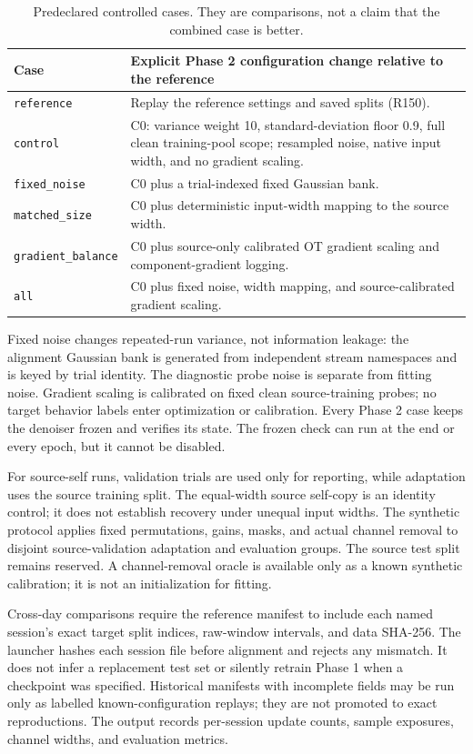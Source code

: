 \documentclass[11pt,a4paper]{article}
\begin{document}
\begin{table}[htbp]
\centering\small
\begin{tabularx}{\linewidth}{@{}lX@{}}
\toprule
Case & Explicit Phase 2 configuration change relative to the reference\\
\midrule
\texttt{reference} & Replay the reference settings and saved splits (R150).\\
\texttt{control} & C0: variance weight 10, standard-deviation floor 0.9, full clean training-pool scope; resampled noise, native input width, and no gradient scaling.\\
\texttt{fixed\_noise} & C0 plus a trial-indexed fixed Gaussian bank.\\
\texttt{matched\_size} & C0 plus deterministic input-width mapping to the source width.\\
\texttt{gradient\_balance} & C0 plus source-only calibrated OT gradient scaling and component-gradient logging.\\
\texttt{all} & C0 plus fixed noise, width mapping, and source-calibrated gradient scaling.\\
\bottomrule
\end{tabularx}
\caption{Predeclared controlled cases. They are comparisons, not a claim that
the combined case is better.}
\end{table}

Fixed noise changes repeated-run variance, not information leakage: the
alignment Gaussian bank is generated from independent stream namespaces and is
keyed by trial identity. The diagnostic probe noise is separate from fitting
noise. Gradient scaling is calibrated on fixed clean source-training probes;
no target behavior labels enter optimization or calibration. Every Phase 2
case keeps the denoiser frozen and verifies its state. The frozen check can run
at the end or every epoch, but it cannot be disabled.

For source-self runs, validation trials are used only for reporting, while
adaptation uses the source training split. The equal-width source self-copy is
an identity control; it does not establish recovery under unequal input widths.
The synthetic protocol applies fixed permutations, gains, masks, and actual
channel removal to disjoint source-validation adaptation and evaluation groups.
The source test split remains reserved. A channel-removal oracle is available
only as a known synthetic calibration; it is not an initialization for fitting.

Cross-day comparisons require the reference manifest to include each named
session's exact target split indices, raw-window intervals, and data SHA-256.
The launcher hashes each session file before alignment and rejects any
mismatch. It does not infer a replacement test set or silently retrain Phase
1 when a checkpoint was specified. Historical manifests with incomplete
fields may be run only as labelled known-configuration replays; they are not
promoted to exact reproductions. The output records per-session update counts,
sample exposures, channel widths, and evaluation metrics.
\end{document}
